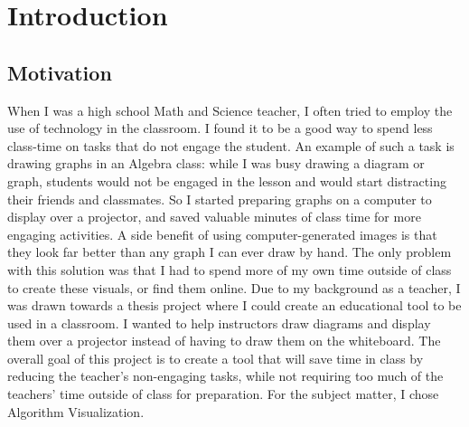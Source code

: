 \chapter{Introduction} 
\section{Motivation}
\hspace{-0.26in}
When I was a high school Math and Science teacher,
I often tried to employ the use of technology in the classroom. 
I found it to be a good way to spend less class-time on tasks that do not 
engage the student. An example of such a task is drawing graphs in an Algebra class:
while I was busy drawing a diagram or graph, students would not be engaged in the lesson
and would start distracting their friends and classmates.
\newline\newline
So I started preparing graphs on a computer to display over a projector, and saved
valuable minutes of class time for more engaging activities. 
A side benefit of using computer-generated images is that they look far better
than any graph I can ever draw by hand. 
The only problem with this solution was that 
I had to spend more of my own time outside of class to create these visuals, or find
them online.
\newline\newline
Due to my background as a teacher, 
I was drawn towards a thesis project where I could create 
an educational tool to be used in a classroom. 
I wanted to help instructors draw diagrams and display them 
over a projector instead of having to draw them on the whiteboard.
The overall goal of this project is to create a tool that will save time in class 
by reducing the teacher's non-engaging tasks, while not requiring too much of the 
teachers' time outside of class for preparation. For the subject matter, I chose 
Algorithm Visualization.
